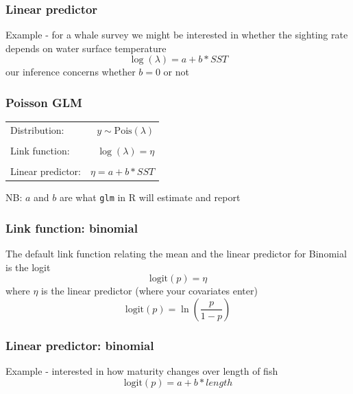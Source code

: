 \documentclass[dvipsnames]{beamer}
\begin{document}
\begin{frame}
 \frametitle{Linear predictor}
Example - for a whale survey we might be interested in whether the sighting rate depends on water surface temperature
\begin{equation*}
 \log(\lambda) = a + b * SST
\end{equation*}
our inference concerns whether $b=0$ or not
\end{frame}

\begin{frame}[fragile]
 \frametitle{Poisson GLM}
\begin{center}
\begin{tabular}{lr}
Distribution: & $y \sim \textrm{Pois}(\lambda)$\\
&\\
Link function: & $\log(\lambda) = \eta$ \\
&\\
Linear predictor: & $\eta = a+b* SST$
\end{tabular}
\end{center}
NB: $a$ and $b$ are what \texttt{glm} in R will estimate and report 
\end{frame}

\begin{frame}[fragile]
 \frametitle{Link function: binomial}
The default link function relating the mean and the linear predictor for Binomial is the logit
\begin{equation*}
 \textrm{logit}(p)=\eta
\end{equation*}
where $\eta$ is the linear predictor (where your covariates enter)\\
\begin{equation*}
\textrm{logit}(p)=\ln\left(\frac{p}{1-p}\right)
\end{equation*}
\end{frame}

\begin{frame}
 \frametitle{Linear predictor: binomial}
Example - interested in how maturity changes over length of fish
\begin{equation*}
\textrm{logit}(p)=a + b * length
\end{equation*}
\end{frame}
\end{document}
